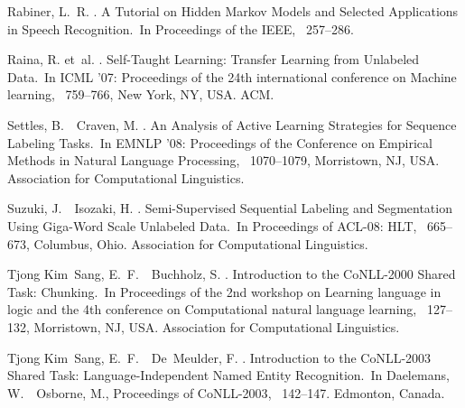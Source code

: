 \documentclass[english]{jnlp_JS2.0}
\begin{document}
\begin{thebibliography}{}
Rabiner, L.~R. \BBCP.
\newblock \BBOQ A Tutorial on Hidden Markov Models and Selected Applications in
  Speech Recognition.\BBCQ\
\newblock In {\Bem Proceedings of the IEEE}, \mbox{\BPGS\ 257--286}.

Raina, R. et~al. \BBOP 2007\BBCP.
\newblock \BBOQ Self-Taught Learning: Transfer Learning from Unlabeled
  Data.\BBCQ\
\newblock In {\Bem ICML '07: Proceedings of the 24th international conference
  on Machine learning}, \mbox{\BPGS\ 759--766}, New York, NY, USA. ACM.

Settles, B.\BBACOMMA\ \BBA\ Craven, M. \BBCP.
\newblock \BBOQ An Analysis of Active Learning Strategies for Sequence Labeling
  Tasks.\BBCQ\
\newblock In {\Bem EMNLP '08: Proceedings of the Conference on Empirical
  Methods in Natural Language Processing}, \mbox{\BPGS\ 1070--1079},
  Morristown, NJ, USA. Association for Computational Linguistics.

Suzuki, J.\BBACOMMA\ \BBA\ Isozaki, H. \BBOP 2008\BBCP.
\newblock \BBOQ Semi-Supervised Sequential Labeling and Segmentation Using
  Giga-Word Scale Unlabeled Data.\BBCQ\
\newblock In {\Bem Proceedings of ACL-08: HLT}, \mbox{\BPGS\ 665--673},
  Columbus, Ohio. Association for Computational Linguistics.

Tjong Kim~Sang, E.~F.\BBACOMMA\ \BBA\ Buchholz, S. \BBOP 2000\BBCP.
\newblock \BBOQ Introduction to the CoNLL-2000 Shared Task: Chunking.\BBCQ\
\newblock In {\Bem Proceedings of the 2nd workshop on Learning language in
  logic and the 4th conference on Computational natural language learning},
  \mbox{\BPGS\ 127--132}, Morristown, NJ, USA. Association for Computational
  Linguistics.

Tjong Kim~Sang, E.~F.\BBACOMMA\ \BBA\ De~Meulder, F. \BBOP 2003\BBCP.
\newblock \BBOQ Introduction to the CoNLL-2003 Shared Task:
  Language-Independent Named Entity Recognition.\BBCQ\
\newblock In Daelemans, W.\BBACOMMA\ \BBA\ Osborne, M.\BEDS, {\Bem Proceedings
  of CoNLL-2003}, \mbox{\BPGS\ 142--147}. Edmonton, Canada.


\end{thebibliography}
\end{document}
